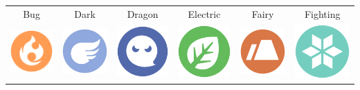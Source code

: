 \begin{table}[h]
\begin{tabular}{c c c c c c}
  Bug & Dark & Dragon & Electric & Fairy & Fighting \\
  \includegraphics[scale=.25]{images/fire.png} &
    \includegraphics[scale=.25]{images/flying.png} &
    \includegraphics[scale=.25]{images/ghost.png} &
    \includegraphics[scale=.25]{images/grass.png} &
    \includegraphics[scale=.25]{images/ground.png} &
    \includegraphics[scale=.25]{images/ice.png} \\

\end{tabular}
\end{table}
